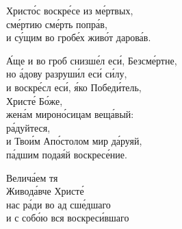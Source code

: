 \documentclass{article}
\begin{document}
%
Христо́с воскре́се из ме́ртвых, \\
сме́ртию сме́рть попра́в, \\
и су́щим во гробе́х живо́т дарова́в.

А́ще и во гроб снизше́л еси́, Безсме́ртне, \\
но а́дову разруши́л еси́ си́лу, \\
и воскре́сл еси́, я́ко Победи́тель, \\
        \cont Христе́ Бо́же, \\
жена́м мироно́сицам веща́вый: \\
        \cont ра́дуйтеся, \\
и Твои́м Апо́столом мир да́руяй, \\
па́дшим подая́й воскресе́ние.

Велича́ем тя \\
Живода́вче Христе́ \\
нас ра́ди во ад сше́дшаго \\
и с собо́ю вся воскреси́вшаго
\end{document}

